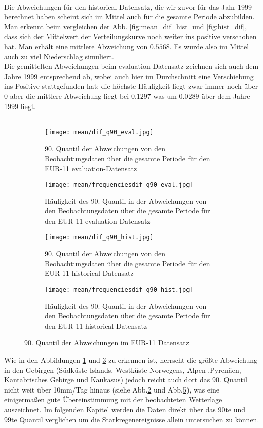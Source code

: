 \hfill\\
Die Abweichungen für den historical-Datensatz, die wir zuvor für das Jahr 1999 berechnet haben scheint sich im Mittel auch für die gesamte Periode abzubilden. Man erkennt beim vergleichen der Abb. \ref{fig:mean_dif_hist} und \ref{fig:hist_dif}, dass sich der Mittelwert der Verteilungskurve noch weiter ins positive verschoben hat. Man erhält eine mittlere Abweichung von $0.5568$. Es wurde also im Mittel auch zu viel Niederschlag simuliert.\\
Die gemittelten Abweichungen beim evaluation-Datensatz zeichnen sich auch dem Jahre 1999 entsprechend ab, wobei auch hier im Durchschnitt eine Verschiebung ins Positive stattgefunden hat: die höchste Häufigkeit liegt zwar immer noch über $0$ aber die mittlere Abweichung liegt bei $0.1297$ was um $0.0289$ über dem Jahre 1999 liegt.\\ \hfill \\
\begin{figure}[h]
	
	\begin{subfigure}[h]{0.49\textwidth}
		\centering
		\texttt{[image: mean/dif\_q90\_eval.jpg]}
		\caption{90. Quantil der Abweichungen von den Beobachtungsdaten über die gesamte Periode für den EUR-11 evaluation-Datensatz}
		\label{fig:q90_dif_eval}
	\end{subfigure}
	\begin{subfigure}[h]{0.49\textwidth}
		\centering
		\texttt{[image: mean/frequenciesdif\_q90\_eval.jpg]}
		\caption{Häufigkeit des 90. Quantil in der Abweichungen von den Beobachtungsdaten über die gesamte Periode für den EUR-11 evaluation-Datensatz}
		\label{fig:q90_freq_dif_eval}
	\end{subfigure}
	\begin{subfigure}[h]{0.49\textwidth}
		\centering
		\texttt{[image: mean/dif\_q90\_hist.jpg]}
		\caption{90. Quantil der Abweichungen von den Beobachtungsdaten über die gesamte Periode für den EUR-11 historical-Datensatz}
		\label{fig:q90_dif_hist}
	\end{subfigure}
	\begin{subfigure}[h]{0.49\textwidth}
		\centering
		\texttt{[image: mean/frequenciesdif\_q90\_hist.jpg]}
		\caption{Häufigkeit des 90. Quantil in der Abweichungen von den Beobachtungsdaten über die gesamte Periode für den EUR-11 historical-Datensatz}
		\label{fig:q90_freq_dif_hist}
	\end{subfigure}
	\caption{90. Quantil der Abweichungen im EUR-11 Datensatz}
\end{figure}

Wie in den Abbildungen \ref{fig:q90_dif_eval} und \ref{fig:q90_dif_hist} zu erkennen ist, herrscht die größte Abweichung in den Gebirgen (Südküste Islands, Westküste Norwegens, Alpen ,Pyrenäen, Kantabrisches Gebirge und Kaukasus) jedoch reicht auch dort das 90. Quantil nicht weit über 10mm/Tag hinaus (siehe Abb.\ref{fig:q90_freq_dif_eval} und Abb.\ref{fig:q90_freq_dif_hist}), was eine einigermaßen gute Übereinstimmung mit der beobachteten Wetterlage auszeichnet. Im folgenden Kapitel werden die Daten direkt über das 90te und 99te Quantil verglichen um die Starkregenereignisse allein untersuchen zu können.
\pagebreak
